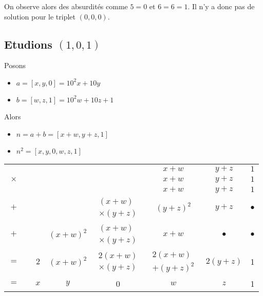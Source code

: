 \documentclass[10pt,a4paper,twocolumn]{article}
\begin{document}
On observe alors des absurdités comme $5=0$ et $6=6=1$. Il n'y a donc pas de solution pour le triplet $(0,0,0)$.

\subsection{Etudions $(1,0,1)$}

Posons 
\begin{itemize}
\item $a=[x,y,0]=10^2 x + 10y$
\item $b=[w,z,1]=10^2 w + 10z + 1$
\end{itemize}
Alors
\begin{itemize}
\item $n=a+b=[x+w,y+z,1]$
\item $n^2=[x,y,0,w,z,1]$
\end{itemize}

\begin{tabular}{cccccccc}
         & & & & & $x+w$ & $y+z$ & $1$ \\
$\times$ & & & & & $x+w$ & $y+z$ & $1$ \\
\hline
 & & & & & $x+w$ & $y+z$ & $1$ \\
$+$ & & & & $\substack{(x+w)\\\times(y+z)}$ & $(y+z)^2$ & $y+z$ & $\bullet$ \\[7mm] 
$+$ & & & $(x+w)^2$ & $\substack{(x+w)\\\times(y+z)}$ & $x+w$ & $\bullet$ & $\bullet$ \\[7mm]
\hline
$=$ & & $2$ & $(x+w)^2$ & $\substack{2(x+w)\\\times(y+z)}$ & $\substack{2(x+w) \\ +(y+z)^2}$ & $2(y+z)$ & 1 \\[7mm]
$=$ & & $x$ & $y$ & 0 & $w$ & $z$ & 1 \\
\end{tabular}
\end{document}
